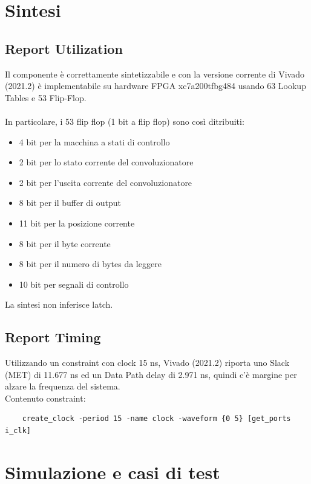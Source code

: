\documentclass[12pt, a4paper]{article}
\begin{document}
\section{Sintesi}

\subsection{Report Utilization}

Il componente è correttamente sintetizzabile e con la versione corrente di Vivado (2021.2) è implementabile su hardware FPGA
xc7a200tfbg484 usando 63 Lookup Tables e 53 Flip-Flop.
\\
\\
\noindent In particolare, i 53 flip flop (1 bit a flip flop) sono così ditribuiti:
\begin{itemize}[itemsep=4pt, topsep=4pt]
    \item 4 bit per la macchina a stati di controllo
    \item 2 bit per lo stato corrente del convoluzionatore
    \item 2 bit per l'uscita corrente del convoluzionatore
    \item 8 bit per il buffer di output
    \item 11 bit per la posizione corrente
    \item 8 bit per il byte corrente
    \item 8 bit per il numero di bytes da leggere
    \item 10 bit per segnali di controllo
\end{itemize}

\noindent La sintesi non inferisce latch.

\subsection{Report Timing}

Utilizzando un constraint con clock 15 ns, Vivado (2021.2) riporta
uno Slack (MET) di 11.677 ns ed un Data Path delay di 2.971 ns, quindi c'è margine per
alzare la frequenza del sistema.
\\

\noindent Contenuto constraint:
\begin{verbatim}
    create_clock -period 15 -name clock -waveform {0 5} [get_ports i_clk]
\end{verbatim}

\section{Simulazione e casi di test}
\end{document}
